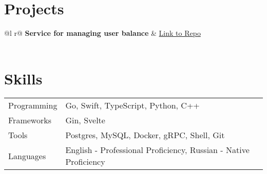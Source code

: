 \documentclass[a4paper,12pt]{article}
\begin{document}
\section{Projects}

\begin{tabularx}{\linewidth}{ @{}l r@{} }
\textbf{Service for managing user balance} & \hfill \href{https://github.com/dupreehkuda/transaction-service}{Link to Repo} \\[3.75pt]
  \\
\end{tabularx}



\section{Skills}
\begin{tabularx}{\linewidth}{@{}l X@{}}
Programming &  \normalsize{Go, Swift, TypeScript, Python, C++}\\
Frameworks &  \normalsize{Gin, Svelte}\\
Tools &  \normalsize{Postgres, MySQL, Docker, gRPC, Shell, Git}\\
Languages &  \normalsize{English - Professional Proficiency, Russian - Native Proficiency}\\  
\end{tabularx}

\vfill
{}
\end{document}
